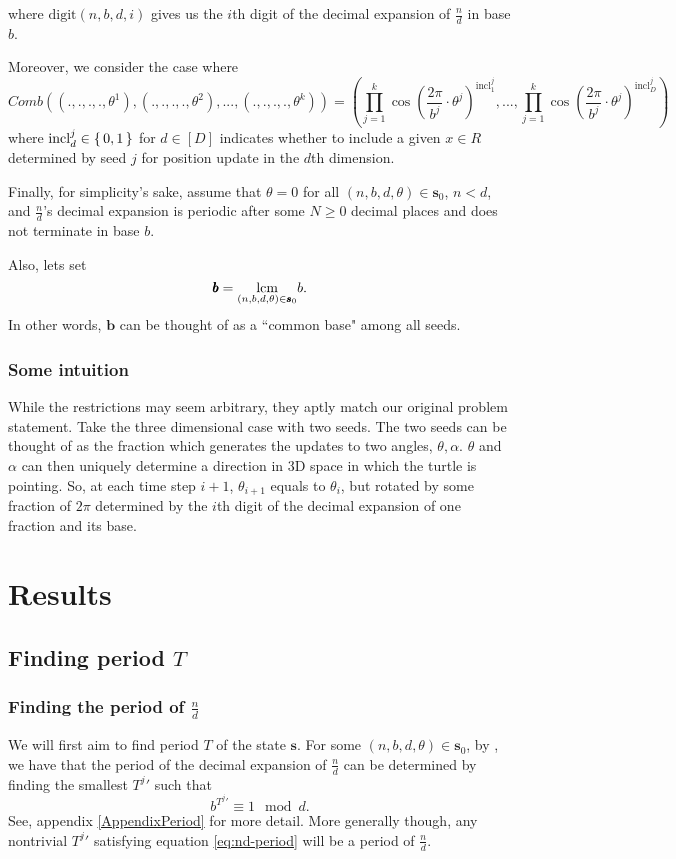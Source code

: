 \documentclass[11pt,titlepage]{article}
\newcommand{\rationalPeriod}{{T^j}'}
\newcommand{\inclIndic}[2]{{\mathrm{incl}_{#1}^{#2}}}
\newcommand{\numbToAngle}{\frac{2\pi}{b^j}}
\newcommand{\combSingleTerm}[1]{\prod_{j=1}^k \cos\left(\numbToAngle \cdot \theta^j\right) ^ {\inclIndic{#1}{j}}}
\newcommand{\commonBase}{\pmb{b}}
\begin{document}
where $\mathrm{digit}(n, b, d, i)$ gives us the $i$th digit of the decimal expansion of $\frac{n}{d}$
in base $b$.

Moreover, we consider the case where
$$
  Comb((., ., ., ., \theta^1), (., ., ., ., \theta^2), ..., (., ., ., ., \theta^k)) =
    \left(\combSingleTerm{1}, ..., \combSingleTerm{D}\right)
$$
where $\mathrm{incl}_d^j \in \set{0, 1}$ for $d \in [D]$ indicates whether to include a given
$x \in R$ determined by seed $j$ for position update in the $d$th dimension.

Finally, for simplicity's sake, assume that $\theta = 0$ for all $(n, b, d, \theta) \in \pmb{s}_0$,
$n < d$, and $\frac{n}{d}$'s decimal expansion is periodic after some $N \geq 0$ decimal places
and does not terminate in base $b$.

Also, lets set 
$$\commonBase = \lcm{(n, b, d, \theta) \in \pmb{s}_0} b.$$
In other words,
$\commonBase$ can be thought of as a ``common base" among all seeds.

\subsubsection{Some intuition}
While the restrictions may seem arbitrary, they aptly match our original problem statement.
Take the three dimensional case with two seeds. The two seeds can be thought
of as the fraction which generates the updates to two angles, $\theta, \alpha$.
$\theta$ and $\alpha$ can then uniquely determine a direction in 3D space in which the 
turtle is pointing. 
So, at each time step $i + 1$, $\theta_{i + 1}$ equals to $\theta_i$, but rotated by
some fraction of $2 \pi$ determined by the $i$th digit of the decimal expansion of one fraction and its base.



\section{Results}
\subsection{Finding period $T$}
\subsubsection{Finding the period of $\frac{n}{d}$}
We will first aim to find period $T$ of the state $\pmb{s}$.
For some $(n, b, d, \theta) \in \pmb{s}_0$, by \cite{MathOverflowFracPeriod},
we have that the period of the decimal expansion of $\frac{n}{d}$
can be determined by finding the smallest $\rationalPeriod$ such that
\begin{equation}
\label{eq:nd-period}
b ^ {\rationalPeriod} \equiv 1 \mod d.
\end{equation}
See, appendix \ref{AppendixPeriod} for more detail.
More generally though, any nontrivial $\rationalPeriod$ satisfying equation \ref{eq:nd-period}
will be a period of $\frac{n}{d}$.
\end{document}
